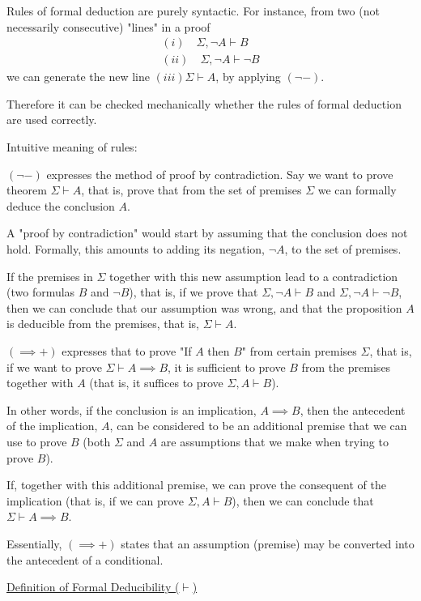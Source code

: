 \documentclass{article}
\begin{document}
Rules of formal deduction are purely syntactic. For instance, from two (not necessarily consecutive) "lines" in a proof
\begin{align*}
    (i) \quad \Sigma, \neg A \vdash B \\
    (ii) \quad \Sigma, \neg A \vdash \neg B
\end{align*}
we can generate the new line $(iii) \Sigma \vdash A$, by applying $(\neg -)$. 

Therefore it can be checked mechanically whether the rules of formal deduction are used correctly. 

Intuitive meaning of rules: 

$(\neg -)$ expresses the method of proof by contradiction. Say we want to prove theorem $\Sigma \vdash A$, that is, prove that from the set of premises $\Sigma$ we can formally deduce the conclusion $A$. 

A "proof by contradiction" would start by assuming that the conclusion does not hold. Formally, this amounts to adding its negation, $\neg A$, to the set of premises. 

If the premises in $\Sigma$ together with this new assumption lead to a contradiction (two formulas $B$ and $\neg B$), that is, if we prove that $\Sigma, \neg A \vdash B$ and $\Sigma, \neg A \vdash \neg B$, then we can conclude that our assumption was wrong, and that the proposition $A$ is deducible from the premises, that is, $\Sigma \vdash A$.

$(\implies +)$ expresses that to prove "If $A$ then $B$" from certain premises $\Sigma$, that is, if we want to prove $\Sigma \vdash A \implies B$, it is sufficient to prove $B$ from the premises together with $A$ (that is, it suffices to prove $\Sigma, A \vdash B$).

In other words, if the conclusion is an implication, $A \implies B$, then the antecedent of the implication, $A$, can be considered to be an additional premise that we can use to prove $B$ (both $\Sigma$ and $A$ are assumptions that we make when trying to prove $B$).

If, together with this additional premise, we can prove the consequent of the implication (that is, if we can prove $\Sigma, A \vdash B$), then we can conclude that $\Sigma \vdash A \implies B$.

Essentially, $(\implies +)$ states that an assumption (premise) may be converted into the antecedent of a conditional. 


\underline{Definition of Formal Deducibility ($\vdash$)}
\end{document}
